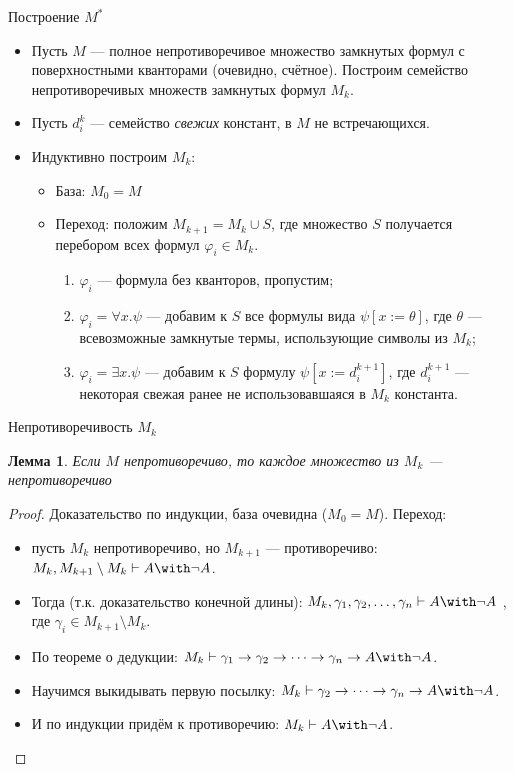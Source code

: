 \documentclass[aspectratio=169]{beamer}
\newtheorem{lmm}{Лемма}[section]
\begin{document}
\begin{frame}{Построение $M^*$}
\begin{itemize}
\item Пусть $M$ --- полное непротиворечивое множество замкнутых формул с поверхностными кванторами (очевидно, счётное). \pause
 Построим семейство непротиворечивых множеств замкнутых формул $M_k$.\pause
\item Пусть $d^k_i$ --- семейство \emph{свежих} констант, в $M$ не встречающихся.\pause
\item Индуктивно построим $M_k$:
\begin{itemize}
\item База: $M_0 = M$\pause
\item Переход: положим $M_{k+1} = M_k \cup S$, где множество $S$ получается перебором всех формул $\varphi_i \in M_k$.\pause
\begin{enumerate}
\item $\varphi_i$ --- формула без кванторов, пропустим;\pause
\item $\varphi_i = \forall x.\psi$ --- добавим к $S$ все формулы вида $\psi [x := \theta]$, где
$\theta$ --- всевозможные замкнутые термы, использующие символы из $M_k$;\pause
\item $\varphi_i = \exists x.\psi$ --- добавим к $S$ формулу $\psi [x := d^{k+1}_i]$, где $d^{k+1}_i$ --- некоторая
свежая ранее не использовавшаяся в $M_k$ константа.\pause
\end{enumerate}
\end{itemize}
\end{itemize}
\end{frame}

\begin{frame}{Непротиворечивость $M_k$}
\begin{lmm}Если $M$ непротиворечиво, то каждое множество из $M_k$ --- непротиворечиво\end{lmm}
\begin{proof}Доказательство по индукции, база очевидна ($M_0 = M$). \pause
Переход: \begin{itemize}
\item пусть $M_k$ непротиворечиво, но $M_{k+1}$ --- противоречиво: $M_k, M_{k+1}\setminus M_k \vdash A\with\neg A$. \pause
\item Тогда (т.к. доказательство конечной длины):
$M_k, \gamma_1, \gamma_2, \dots,\gamma_n\vdash A\with\neg A$
, где $\gamma_i \in M_{k+1}\setminus M_k$. \pause
\item По теореме о дедукции: $M_k\vdash \gamma_1\to\gamma_2\to\dots\to\gamma_n\to A\with\neg A$. \pause
\item Научимся выкидывать первую посылку: $M_k\vdash \gamma_2\to\dots\to\gamma_n\to A\with\neg A$. \pause
\item И по индукции придём к противоречию: $M_k \vdash A\with\neg A$.
\end{itemize}

\end{proof}
\end{frame}
\end{document}
